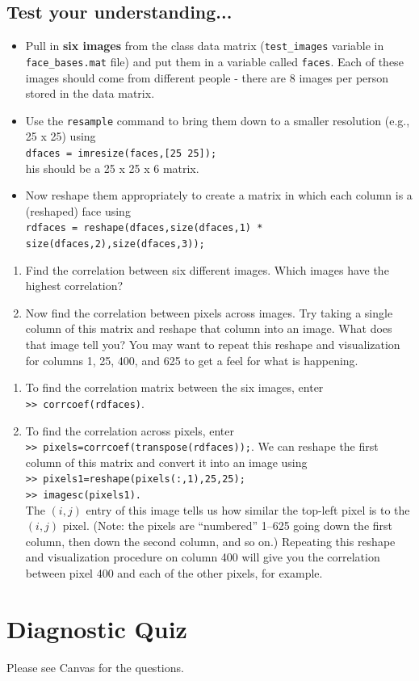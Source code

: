 \subsection{Test your understanding...}
\begin{itemize}
\item  Pull in \textbf{six images} from the class data matrix (\texttt{test\_images} variable in \texttt{face\_bases.mat} file) and put them in a variable called \texttt{faces}.
Each of these images should come from different people - there are 8 images per person stored in the data matrix.
\item Use the \texttt{resample} command to bring them down to a smaller resolution (e.g., 25 x 25) using\\
\texttt{dfaces = imresize(faces,[25 25]);}\\
his should be a 25 x 25 x 6 matrix.
\item Now reshape them appropriately to create a matrix in which each column is a (reshaped) face using\\
\texttt{rdfaces =  reshape(dfaces,size(dfaces,1) * size(dfaces,2),size(dfaces,3));}\\
\end{itemize}

\begin{prob}
\begin{enumerate}
\item Find the correlation between six different images.  Which images have the highest correlation?
\item Now find the correlation between pixels across images. Try taking a single column of this matrix and reshape that column into an image.  What does that image tell you? You may want to repeat this reshape and visualization for columns 1, 25, 400, and 625 to get a feel for what is happening.
\end{enumerate}
\end{prob}
\begin{sol}
\begin{enumerate}
    \item To find the correlation matrix between the six images, enter\\ \texttt{>> corrcoef(rdfaces)}. 
    \item To find the correlation across pixels, enter\\ \texttt{>> pixels=corrcoef(transpose(rdfaces));}. We can reshape the first column of this matrix and convert it into an image using\\
    \texttt{>> pixels1=reshape(pixels(:,1),25,25);}\\
    \texttt{>> imagesc(pixels1).}\\
    The $(i,j)$ entry of this image tells us how similar the top-left pixel is to the $(i,j)$ pixel. (Note: the pixels are ``numbered'' 1--625 going down the first column, then down the second column, and so on.) Repeating this reshape and visualization procedure on column 400 will give you the correlation between pixel 400 and each of the other pixels, for example.
\end{enumerate}
\end{sol}

\section{Diagnostic Quiz}

Please see Canvas for the questions.

\pagebreak
\shipoutAnswer
